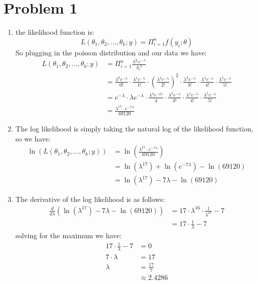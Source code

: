 \documentclass{article}
\title{\thetitle}
\author{\theauthor}
\begin{document}
\maketitle
\section*{Problem 1}
\begin{enumerate}
\item the likelihood function is: \\
\[
L(\theta_1, \theta_2, \ldots, \theta_k;y) = \Pi_{i=1}^nf(y_i; \theta)
\]
So plugging in the poisson distribution and our data we have: \\
\begin{align*}
L(\theta_1, \theta_2, \ldots, \theta_k;y) &= \Pi_{i=1}^n\frac{\lambda^{y_i}e^{-\lambda}}{y_i!} \\
&= \frac{\lambda^{0}e^{-\lambda}}{0!} \cdot \frac{\lambda^{1}e^{-\lambda}}{1!} \cdot (\frac{\lambda^{2}e^{-\lambda}}{2!})^2 \cdot \frac{\lambda^{3}e^{-\lambda}}{3!} \cdot \frac{\lambda^{4}e^{-\lambda}}{4!} \cdot \frac{\lambda^{5}e^{-\lambda}}{5!} \\
&= e^{-\lambda} \cdot \lambda e^{-\lambda} \cdot \frac{\lambda^{4}e^{-2\lambda}}{4} \cdot \frac{\lambda^{3}e^{-\lambda}}{3!} \cdot \frac{\lambda^{4}e^{-\lambda}}{4!} \cdot \frac{\lambda^{5}e^{-\lambda}}{5!} \\
&= \frac{\lambda^{17} \cdot e^{-7 \lambda}}{69120}
\end{align*}
\item The log likelihood is simply taking the natural log of the likelihood function, so we have: \\
\begin{align*}
\ln (L(\theta_1, \theta_2, \ldots, \theta_k;y)) &= \ln(\frac{\lambda^{17} \cdot e^{-7 \lambda}}{69120}) \\
&= \ln(\lambda^{17}) + \ln(e^{-7\lambda}) - \ln(69120) \\
&= \ln(\lambda^{17}) - 7\lambda - \ln(69120)
\end{align*}
\item The derivative of the log likelihood is as follows: \\
\begin{align*}
\frac{d}{d\lambda}(\ln(\lambda^{17}) - 7\lambda - \ln(69120)) &= 17 \cdot \lambda^{16} \cdot \frac{1}{\lambda^{17}} - 7 \\
&= 17 \cdot \frac{1}{\lambda} - 7
\end{align*}
solving for the maximum we have: \\
\begin{align*}
17 \cdot \frac{1}{\lambda} - 7 &= 0 \\
7 \cdot \lambda &= 17 \\
\lambda &= \frac{17}{7} \\
&\approx 2.4286
\end{align*}
\end{enumerate}
\end{document}
